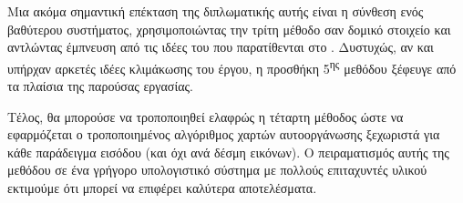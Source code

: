 Μια ακόμα σημαντική επέκταση της διπλωματικής αυτής είναι η σύνθεση ενός βαθύτερου συστήματος, χρησιμοποιώντας την τρίτη μέθοδο σαν δομικό στοιχείο και αντλώντας έμπνευση από τις ιδέες του  που παρατίθενται στο \cite{hinton2021represent_GLOM}. Δυστυχώς, αν και υπήρχαν αρκετές ιδέες κλιμάκωσης του έργου, η προσθήκη 5\textsuperscript{ης} μεθόδου ξέφευγε από τα πλαίσια της παρούσας εργασίας.\par

Τέλος, θα μπορούσε να τροποποιηθεί ελαφρώς η τέταρτη μέθοδος ώστε να εφαρμόζεται ο τροποποιημένος αλγόριθμος χαρτών αυτο\textendash οργάνωσης ξεχωριστά για κάθε παράδειγμα εισόδου (και όχι ανά δέσμη εικόνων). Ο πειραματισμός αυτής της μεθόδου σε ένα γρήγορο υπολογιστικό σύστημα με πολλούς επιταχυντές υλικού εκτιμούμε ότι μπορεί να επιφέρει καλύτερα αποτελέσματα.